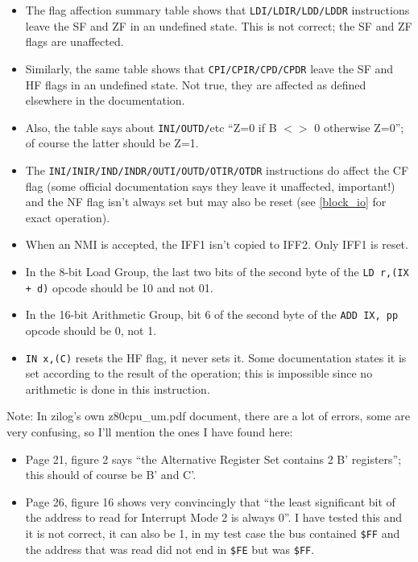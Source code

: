 \begin{itemize}

    \item
    The flag affection summary table shows that {\tt LDI/LDIR/LDD/LDDR} instructions leave the SF and ZF in an undefined state. This is not correct; the SF and ZF flags are unaffected.

    \item
    Similarly, the same table shows that {\tt CPI/CPIR/CPD/CPDR} leave the SF and HF flags in an undefined state. Not true, they are affected as defined elsewhere in the documentation.

    \item
    Also, the table says about {\tt INI/OUTD/}etc ``Z=0 if B $<>$ 0 otherwise Z=0''; of course the latter should be Z=1.

    \item
    The {\tt INI/INIR/IND/INDR/OUTI/OUTD/OTIR/OTDR} instructions do affect the CF flag (some official documentation says they leave it unaffected, important!) and the NF flag isn't always set but may also be reset (see \ref{block_io} for exact operation).

    \item
    When an NMI is accepted, the IFF1 isn't copied to IFF2. Only IFF1 is reset.

    \item
    In the 8-bit Load Group, the last two bits of the second byte of the {\tt LD r,(IX + d)} opcode should be 10 and not 01.

    \item
    In the 16-bit Arithmetic Group, bit 6 of the second byte of the {\tt ADD IX, pp} opcode should be 0, not 1.

    \item
    {\tt IN x,(C)} resets the HF flag, it never sets it. Some documentation states it is set according to the result of the operation; this is impossible since no arithmetic is done in this instruction.

\end{itemize}

Note: In zilog's own z80cpu\_um.pdf document, there are a lot of errors, some are very confusing, so I'll mention the ones I have found here:

\begin{itemize}

    \item
    Page 21, figure 2 says ``the Alternative Register Set contains 2 B' registers''; this should of course be B' and C'.  

    \item
    Page 26, figure 16 shows very convincingly that ``the least significant bit of the address to read for Interrupt Mode 2 is always 0''. I have tested this and it is not correct, it can also be 1, in my test case the bus contained {\tt \$FF} and the address that was read did not end in {\tt \$FE} but was {\tt \$FF}.
  
\end{itemize}
